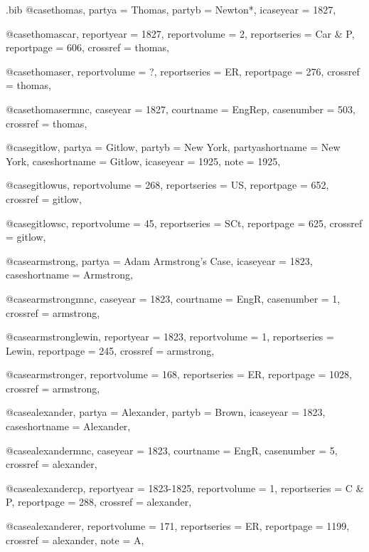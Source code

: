 \begin{filecontents*}[overwrite]{\jobname.bib}
@case{thomas,
  partya = {Thomas},
  partyb = {Newton*},
  icaseyear = {1827},
	}

@case{thomascar,
  reportyear = {1827},
  reportvolume = {2},
  reportseries = {Car \& P},
  reportpage = {606},
  crossref = {thomas},
}

@case{thomaser,
  reportvolume = {?},
  reportseries = {ER},
  reportpage = {276},
  crossref = {thomas},
}

@case{thomasermnc,
  caseyear = {1827},
  courtname = {EngRep},
  casenumber = {503},
  crossref = {thomas},
}


@case{gitlow,
  partya = {Gitlow},
  partyb = {New York},%
  partyashortname = {New York}, 
  caseshortname = {Gitlow},
  icaseyear = {1925},
  note = {1925},
	}


@case{gitlowus,
  reportvolume = {268},
  reportseries = {US},
  reportpage = {652},
  crossref = {gitlow},
}


@case{gitlowsc,
  reportvolume = {45},
  reportseries = {SCt},
  reportpage = {625},
  crossref = {gitlow},
}

@case{armstrong,
  partya = {Adam Armstrong's Case},
  icaseyear = {1823},
  caseshortname = {Armstrong},
	}

@case{armstrongmnc,
  caseyear = {1823},
  courtname = {EngR},
  casenumber = {1},
  crossref = {armstrong},
}


@case{armstronglewin,
  reportyear = {1823},
  reportvolume = {1},
  reportseries = {Lewin},
  reportpage = {245},
  crossref = {armstrong},
}

@case{armstronger,
  reportvolume = {168},
  reportseries = {ER},
  reportpage = {1028},
  crossref = {armstrong},
}




@case{alexander,
  partya = {Alexander},
  partyb = {Brown},
  icaseyear = {1823},
  caseshortname = {Alexander},
	}

@case{alexandermnc,
  caseyear = {1823},
  courtname = {EngR},
  casenumber = {5},
  crossref = {alexander},
}


@case{alexandercp,
  reportyear = {1823-1825},
  reportvolume = {1},
  reportseries = {C \& P},
  reportpage = {288},
  crossref = {alexander},
}

@case{alexanderer,
  reportvolume = {171},
  reportseries = {ER},
  reportpage = {1199},
  crossref = {alexander},
  note = {A},
}




\end{filecontents*}
